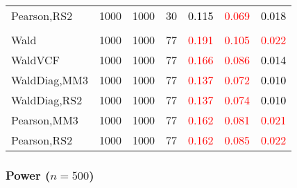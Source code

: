 \documentclass[
]{article}
\begin{document}
\begin{table}[H]
{\begin{tabular}[t]{lrrrrrr}
\hspace{1em}Pearson,RS2 & 1000 & 1000 & 30 & \textcolor{black}{0.115} & \textcolor{red}{0.069} & \textcolor{black}{0.018}\\
\addlinespace[0.3em]
\multicolumn{7}{l}{\textbf{3F 15V}}\\
\hspace{1em}Wald & 1000 & 1000 & 77 & \textcolor{red}{0.191} & \textcolor{red}{0.105} & \textcolor{red}{0.022}\\
\hspace{1em}WaldVCF & 1000 & 1000 & 77 & \textcolor{red}{0.166} & \textcolor{red}{0.086} & \textcolor{black}{0.014}\\
\hspace{1em}WaldDiag,MM3 & 1000 & 1000 & 77 & \textcolor{red}{0.137} & \textcolor{red}{0.072} & \textcolor{black}{0.010}\\
\hspace{1em}WaldDiag,RS2 & 1000 & 1000 & 77 & \textcolor{red}{0.137} & \textcolor{red}{0.074} & \textcolor{black}{0.010}\\
\hspace{1em}Pearson,MM3 & 1000 & 1000 & 77 & \textcolor{red}{0.162} & \textcolor{red}{0.081} & \textcolor{red}{0.021}\\
\hspace{1em}Pearson,RS2 & 1000 & 1000 & 77 & \textcolor{red}{0.162} & \textcolor{red}{0.085} & \textcolor{red}{0.022}\\
\bottomrule
\end{tabular}}
\endgroup{}
\end{table}

\hypertarget{power-n500-3}{%
\subsubsection{\texorpdfstring{Power
(\(n=500\))}{Power (n=500)}}\label{power-n500-3}}
\end{document}
